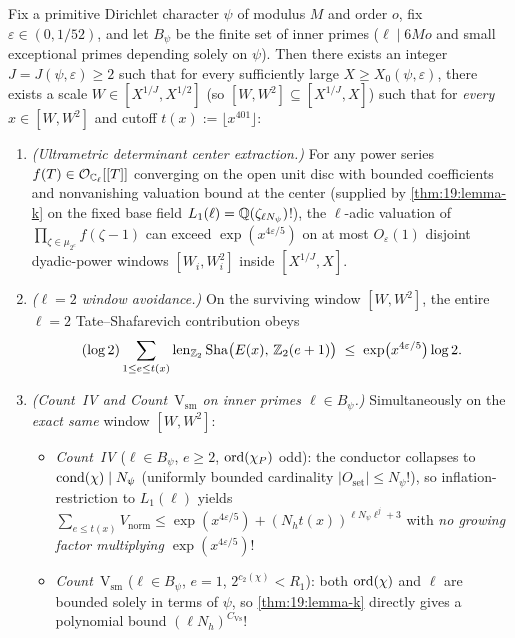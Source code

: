 \begin{theorem}
\label{thm:19:window-avoidance}
Fix a primitive Dirichlet character $\psi$ of modulus $M$ and order $o$, fix $\varepsilon \in (0, 1/52)$, and let $B_\psi$ be the finite set of inner primes ($\ell \mid 6 M o$ and small exceptional primes depending solely on $\psi$). Then there exists an integer $J = J(\psi, \varepsilon) \ge 2$ such that for every sufficiently large $X \ge X_0(\psi, \varepsilon)$, there exists a scale $W \in [X^{1/J}, X^{1/2}]$ (so $[W, W^2] \subseteq [X^{1/J}, X]$) such that for \emph{every} $x \in [W, W^2]$ and cutoff $t(x) := \lfloor x^{401}\rfloor$:
\begin{enumerate}[label=\textup{(\roman*)}]
\item \emph{(Ultrametric determinant center extraction.)} For any power series $f(T) \in \mathcal{O}_{\mathbb{C}_\ell}[[T]]$ converging on the open unit disc with bounded coefficients and nonvanishing valuation bound at the center (supplied by \cref{thm:19:lemma-k} on the fixed base field $L_1(\ell) = \mathbb{Q}(\zeta_{\ell N_\psi})$!), the $\ell$-adic valuation of $\prod_{\zeta \in \mu_{2^e}} f(\zeta - 1)$ can exceed $\exp(x^{4\varepsilon/5})$ on at most $O_\varepsilon(1)$ disjoint dyadic-power windows $[W_i, W_i^2]$ inside $[X^{1/J}, X]$.
\item \emph{($\ell = 2$ window avoidance.)} On the surviving window $[W, W^2]$, the entire $\ell = 2$ Tate--Shafarevich contribution obeys
  \begin{equation}
  \label{eq:19:l2-avoid}
    (\log 2) \sum_{1 \le e \le t(x)} \operatorname{len}_{\mathbb{Z}_2}\mathrm{Sha}\bigl(E(x),\, \mathbb{Z}_2(e+1)\bigr) \;\le\; \exp\bigl(x^{4\varepsilon/5}\bigr)\log 2.
  \end{equation}
\item \emph{(Count~IV and Count~$\mathrm{V}_{\mathrm{sm}}$ on inner primes $\ell \in B_\psi$.)} Simultaneously on the \emph{exact same} window $[W, W^2]$:
  \begin{itemize}
  \item \emph{Count~IV} ($\ell \in B_\psi$, $e \ge 2$, $\operatorname{ord}(\chi_P)$ odd): the conductor collapses to $\operatorname{cond}(\chi) \mid N_\psi$ (uniformly bounded cardinality $|O_{\mathrm{set}}| \le N_\psi$!), so inflation-restriction to $L_1(\ell)$ yields $\sum_{e \le t(x)} V_{\mathrm{norm}} \le \exp(x^{4\varepsilon/5}) + (N_h t(x))^{\ell N_\psi \ell^j + 3}$ with \emph{no growing factor multiplying $\exp(x^{4\varepsilon/5})$}!
  \item \emph{Count~$\mathrm{V}_{\mathrm{sm}}$} ($\ell \in B_\psi$, $e = 1$, $2^{c_2(\chi)} < R_1$): both $\operatorname{ord}(\chi)$ and $\ell$ are bounded solely in terms of $\psi$, so \cref{thm:19:lemma-k} directly gives a polynomial bound $(\ell N_h)^{C_{\mathrm{Vs}}}$!
  \end{itemize}
\end{enumerate}
\end{theorem}

